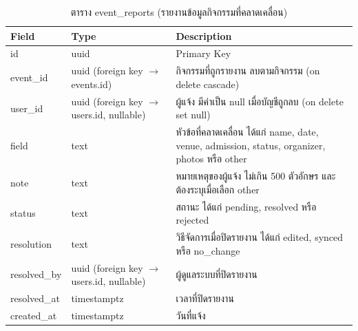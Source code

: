 \begin{table}[H]
\centering
\caption{ตาราง event\_reports (รายงานข้อมูลกิจกรรมที่คลาดเคลื่อน)}
\label{tab:db_eventreports}
\begin{tabular}{|p{3.6cm}|p{2.6cm}|p{6.8cm}|}
\hline
\textbf{Field} & \textbf{Type} & \textbf{Description} \\
\hline
id & uuid & Primary Key \\ \hline
event\_id & uuid (foreign key $\to$ events.id) & กิจกรรมที่ถูกรายงาน ลบตามกิจกรรม (on delete cascade) \\ \hline
user\_id & uuid (foreign key $\to$ users.id, nullable) & ผู้แจ้ง มีค่าเป็น null เมื่อบัญชีถูกลบ (on delete set null) \\ \hline
field & text & หัวข้อที่คลาดเคลื่อน ได้แก่ name, date, venue, admission, status, organizer, photos หรือ other \\ \hline
note & text & หมายเหตุของผู้แจ้ง ไม่เกิน 500 ตัวอักษร และต้องระบุเมื่อเลือก other \\ \hline
status & text & สถานะ ได้แก่ pending, resolved หรือ rejected \\ \hline
resolution & text & วิธีจัดการเมื่อปิดรายงาน ได้แก่ edited, synced หรือ no\_change \\ \hline
resolved\_by & uuid (foreign key $\to$ users.id, nullable) & ผู้ดูแลระบบที่ปิดรายงาน \\ \hline
resolved\_at & timestamptz & เวลาที่ปิดรายงาน \\ \hline
created\_at & timestamptz & วันที่แจ้ง \\
\hline
\end{tabular}
\end{table}

